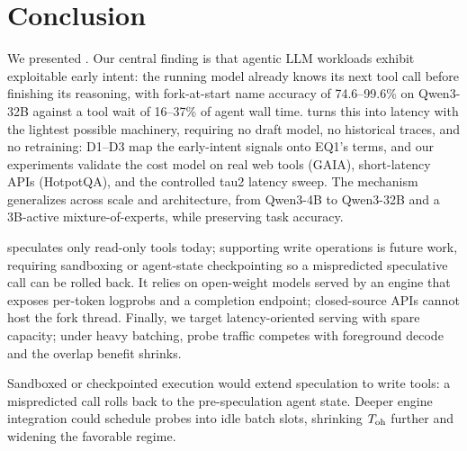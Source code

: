 \section{Conclusion}
\label{sec:conclusion}

We presented \spork{}.
Our central finding is that agentic LLM workloads exhibit exploitable early intent: the
running model already knows its next tool call before finishing its reasoning, with
fork-at-start name accuracy of 74.6--99.6\% on Qwen3-32B against a tool wait of
16--37\% of agent wall time.
\spork{} turns this into latency with the lightest possible machinery, requiring no
draft model, no historical traces, and no retraining: D1--D3 map the early-intent
signals onto EQ1's terms, and our experiments validate the cost model on real web tools
(GAIA), short-latency APIs (HotpotQA), and the controlled tau2 latency sweep.
The mechanism generalizes across scale and architecture, from Qwen3-4B to Qwen3-32B and
a 3B-active mixture-of-experts, while preserving task accuracy.

\spork{} speculates only read-only tools today; supporting write operations is future
work, requiring sandboxing or agent-state checkpointing so a mispredicted speculative
call can be rolled back.
It relies on open-weight models served by an engine that exposes per-token logprobs and
a completion endpoint; closed-source APIs cannot host the fork thread.
Finally, we target latency-oriented serving with spare capacity; under heavy batching,
probe traffic competes with foreground decode and the overlap benefit shrinks.

Sandboxed or checkpointed execution would extend speculation to write tools: a
mispredicted call rolls back to the pre-speculation agent state.
Deeper engine integration could schedule probes into idle batch slots, shrinking
$T_{\mathrm{oh}}$ further and widening the favorable regime.
